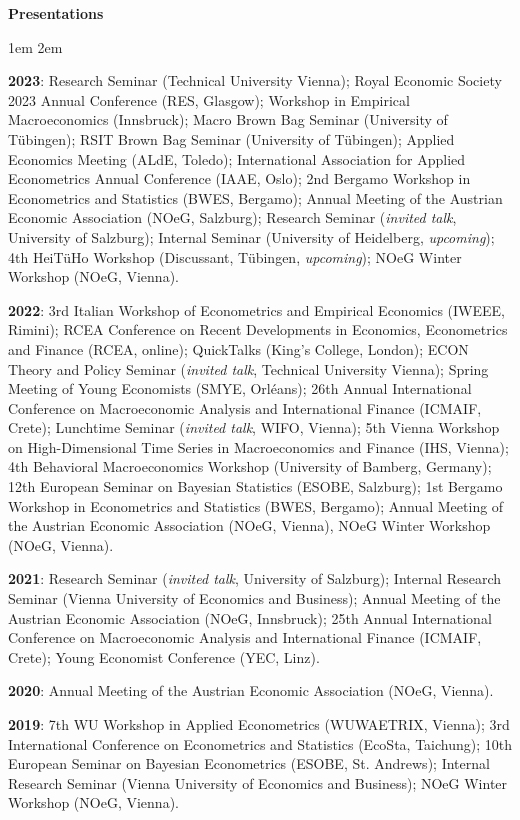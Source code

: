\documentclass{resume} %
\begin{document}
\vspace{0.5cm}
{\textbf{\large Presentations}}
\par \begingroup \leftskip1em \rightskip2em
    {\textbf{2023}: Research Seminar (Technical University Vienna); Royal Economic Society 2023 Annual Conference (RES, Glasgow); Workshop in Empirical Macroeconomics (Innsbruck); Macro Brown Bag Seminar (University of T\"{u}bingen); RSIT Brown Bag Seminar (University of T\"{u}bingen); Applied Economics Meeting (ALdE, Toledo); International Association for Applied Econometrics Annual Conference (IAAE, Oslo); 2nd Bergamo Workshop in Econometrics and Statistics (BWES, Bergamo); Annual Meeting of the Austrian Economic Association (NOeG, Salzburg); Research Seminar (\textit{invited talk}, University of Salzburg); Internal Seminar (University of Heidelberg, \textit{upcoming}); 4th HeiT\"{u}Ho Workshop (Discussant, T\"{u}bingen, \textit{upcoming}); NOeG Winter Workshop (NOeG, Vienna).

    \textbf{2022}: 3rd Italian Workshop of Econometrics and Empirical Economics (IWEEE, Rimini); RCEA Conference on Recent Developments in Economics, Econometrics and Finance (RCEA, online); QuickTalks (King's College, London); ECON Theory and Policy Seminar (\textit{invited talk}, Technical University Vienna); Spring Meeting of Young Economists (SMYE, Orl\'{e}ans); 26th Annual International Conference on Macroeconomic Analysis and International Finance (ICMAIF, Crete); Lunchtime Seminar (\textit{invited talk}, WIFO, Vienna); 5th Vienna Workshop on High-Dimensional Time Series in Macroeconomics and Finance (IHS, Vienna); 4th Behavioral Macroeconomics Workshop (University of Bamberg, Germany); 12th European Seminar on Bayesian Statistics (ESOBE, Salzburg); 1st Bergamo Workshop in Econometrics and Statistics (BWES, Bergamo); Annual Meeting of the Austrian Economic Association (NOeG, Vienna), NOeG Winter Workshop (NOeG, Vienna).

    \textbf{2021}: Research Seminar (\textit{invited talk}, University of Salzburg); Internal Research Seminar (Vienna University of Economics and Business); Annual Meeting of the Austrian Economic Association (NOeG, Innsbruck); 25th Annual International Conference on Macroeconomic Analysis and International Finance (ICMAIF, Crete); Young Economist Conference (YEC, Linz).

    \textbf{2020}: Annual Meeting of the Austrian Economic Association (NOeG, Vienna).

    \textbf{2019}: 7th WU Workshop in Applied Econometrics (WUWAETRIX, Vienna); 3rd International Conference on Econometrics and Statistics (EcoSta, Taichung); 10th European Seminar on Bayesian Econometrics (ESOBE, St. Andrews); Internal Research Seminar (Vienna University of Economics and Business); NOeG Winter Workshop (NOeG, Vienna).
    }
\par \endgroup
\end{document}
